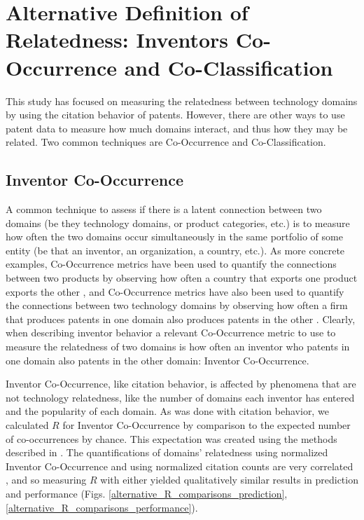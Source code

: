 \documentclass{dsj}
\begin{document}
\section{Alternative Definition of Relatedness: Inventors Co-Occurrence and Co-Classification}\label{alternative_measures}
This study has focused on measuring the relatedness between technology domains by using the citation behavior of patents. However, there are other ways to use patent data to measure how much domains interact, and thus how they may be related. Two common techniques are Co-Occurrence and Co-Classification.

\subsection{Inventor Co-Occurrence}
A common technique to assess if there is a latent connection between two domains (be they technology domains, or product categories, etc.) is to measure how often the two domains occur simultaneously in the same portfolio of some entity (be that an inventor, an organization, a country, etc.). As more concrete examples, Co-Occurrence metrics have been used to quantify the connections between two products by observing how often a country that exports one product exports the other \cite{Hidalgo2007}, and Co-Occurrence metrics have also been used to quantify the connections between two technology domains by observing how often a firm that produces patents in one domain also produces patents in the other \cite{Alstott2017}. Clearly, when describing inventor behavior a relevant Co-Occurrence metric to use to measure the relatedness of two domains is how often an inventor who patents in one domain also patents in the other domain: Inventor Co-Occurrence.

Inventor Co-Occurrence, like citation behavior, is affected by phenomena that are not technology relatedness, like the number of domains each inventor has entered and the popularity of each domain. As was done with citation behavior, we calculated $R$ for Inventor Co-Occurrence by comparison to the expected number of co-occurrences by chance. This expectation was created using the methods described in %
\cite{Alstott2017}. The quantifications of domains' relatedness using normalized Inventor Co-Occurrence and using normalized citation counts are very correlated \cite{Alstott2017}, and so measuring $R$ with either yielded qualitatively similar results in prediction and performance (Figs. \ref{alternative_R_comparisons_prediction}, \ref{alternative_R_comparisons_performance}).
\end{document}
